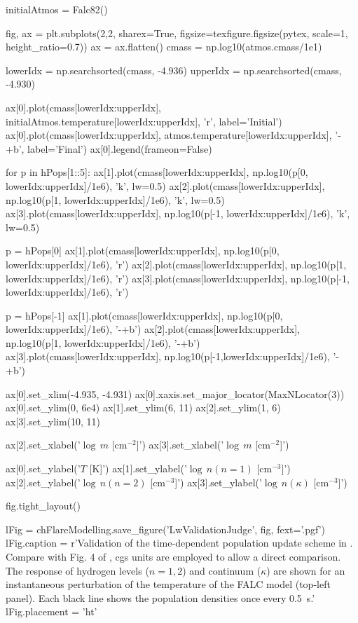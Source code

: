 \begin{pycode}[FlareModelling]
initialAtmos = Falc82()

fig, ax = plt.subplots(2,2, sharex=True, figsize=texfigure.figsize(pytex, scale=1, height_ratio=0.7))
ax = ax.flatten()
cmass = np.log10(atmos.cmass/1e1)

lowerIdx = np.searchsorted(cmass, -4.936)
upperIdx = np.searchsorted(cmass, -4.930)

ax[0].plot(cmass[lowerIdx:upperIdx], initialAtmos.temperature[lowerIdx:upperIdx], 'r', label='Initial')
ax[0].plot(cmass[lowerIdx:upperIdx], atmos.temperature[lowerIdx:upperIdx], '-+b', label='Final')
ax[0].legend(frameon=False)

for p in hPops[1::5]:
    ax[1].plot(cmass[lowerIdx:upperIdx], np.log10(p[0, lowerIdx:upperIdx]/1e6), 'k', lw=0.5)
    ax[2].plot(cmass[lowerIdx:upperIdx], np.log10(p[1, lowerIdx:upperIdx]/1e6), 'k', lw=0.5)
    ax[3].plot(cmass[lowerIdx:upperIdx], np.log10(p[-1, lowerIdx:upperIdx]/1e6), 'k', lw=0.5)

p = hPops[0]
ax[1].plot(cmass[lowerIdx:upperIdx], np.log10(p[0, lowerIdx:upperIdx]/1e6), 'r')
ax[2].plot(cmass[lowerIdx:upperIdx], np.log10(p[1, lowerIdx:upperIdx]/1e6), 'r')
ax[3].plot(cmass[lowerIdx:upperIdx], np.log10(p[-1, lowerIdx:upperIdx]/1e6), 'r')

p = hPops[-1]
ax[1].plot(cmass[lowerIdx:upperIdx], np.log10(p[0, lowerIdx:upperIdx]/1e6),  '-+b')
ax[2].plot(cmass[lowerIdx:upperIdx], np.log10(p[1, lowerIdx:upperIdx]/1e6),  '-+b')
ax[3].plot(cmass[lowerIdx:upperIdx], np.log10(p[-1,lowerIdx:upperIdx]/1e6), '-+b')

ax[0].set_xlim(-4.935, -4.931)
ax[0].xaxis.set_major_locator(MaxNLocator(3))
ax[0].set_ylim(0, 6e4)
ax[1].set_ylim(6, 11)
ax[2].set_ylim(1, 6)
ax[3].set_ylim(10, 11)

ax[2].set_xlabel('$\log\,m$ [cm$^{-2}$]')
ax[3].set_xlabel('$\log\,m$ [cm$^{-2}$]')

ax[0].set_ylabel('$T$ [K]')
ax[1].set_ylabel('$\log\,n(n=1)$ [cm$^{-3}$]')
ax[2].set_ylabel('$\log\,n(n=2)$ [cm$^{-3}$]')
ax[3].set_ylabel('$\log\,n(\kappa)$ [cm$^{-3}$]')

fig.tight_layout()

lFig = chFlareModelling.save_figure('LwValidationJudge', fig, fext='.pgf')
lFig.caption = r'Validation of the time-dependent population update scheme in \Lw{}. Compare with Fig. 4 of \citet{Judge2017}, cgs units are employed to allow a direct comparison. The response of hydrogen levels ($n=1, 2$) and continuum ($\kappa$) are shown for an instantaneous perturbation of the temperature of the FALC model (top-left panel). Each black line shows the population densities once every \SI{0.5}{\second}.'
lFig.placement = 'ht'
\end{pycode}

